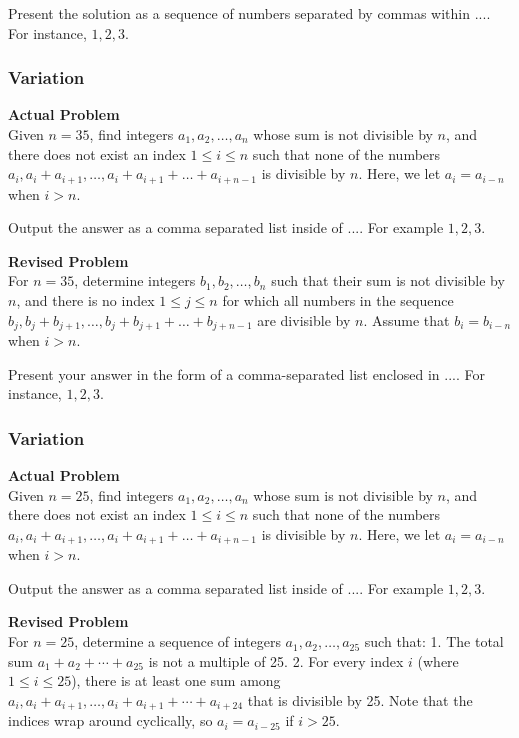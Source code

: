 Present the solution as a sequence of numbers separated by commas within $\boxed{...}$. For instance, $\boxed{1, 2, 3}$.

\subsubsection{Variation}
\textbf{Actual Problem}\\
Given $n = 35$, find integers $a_1,a_2,\ldots, a_n$ whose sum is not divisible by $n$, 
and there does not exist an index $1 \leq i \leq n$ such that none of the numbers $a_i,a_i+a_{i+1},\ldots,a_i+a_{i+1}+\ldots+a_{i+n-1}$ is divisible by $n$. 
Here, we let $a_i=a_{i-n}$ when $i >n$.


Output the answer as a comma separated list inside of $\boxed{...}$. For example $\boxed{1, 2, 3}$.

\textbf{Revised Problem}\\
For $n = 35$, determine integers $b_1, b_2, \ldots, b_n$ such that their sum is not divisible by $n$, and there is no index $1 \leq j \leq n$ for which all numbers in the sequence $b_j, b_j + b_{j+1}, \ldots, b_j + b_{j+1} + \ldots + b_{j+n-1}$ are divisible by $n$. Assume that $b_i = b_{i-n}$ when $i > n$.

Present your answer in the form of a comma-separated list enclosed in $\boxed{...}$. For instance, $\boxed{1, 2, 3}$.

\subsubsection{Variation}
\textbf{Actual Problem}\\
Given $n = 25$, find integers $a_1,a_2,\ldots, a_n$ whose sum is not divisible by $n$, 
and there does not exist an index $1 \leq i \leq n$ such that none of the numbers $a_i,a_i+a_{i+1},\ldots,a_i+a_{i+1}+\ldots+a_{i+n-1}$ is divisible by $n$. 
Here, we let $a_i=a_{i-n}$ when $i >n$.


Output the answer as a comma separated list inside of $\boxed{...}$. For example $\boxed{1, 2, 3}$.

\textbf{Revised Problem}\\
For \( n = 25 \), determine a sequence of integers \( a_1, a_2, \ldots, a_{25} \) such that:
1. The total sum \( a_1 + a_2 + \cdots + a_{25} \) is not a multiple of 25.
2. For every index \( i \) (where \( 1 \leq i \leq 25 \)), there is at least one sum among \( a_i, a_i + a_{i+1}, \ldots, a_i + a_{i+1} + \cdots + a_{i+24} \) that is divisible by 25. Note that the indices wrap around cyclically, so \( a_i = a_{i-25} \) if \( i > 25 \).

